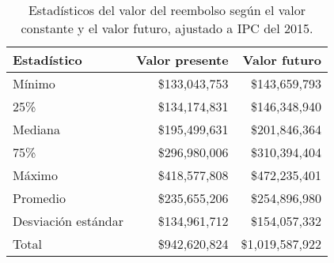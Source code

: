 \begin{table}[!htbp]
\centering
\caption{Estadísticos del valor del reembolso según el valor constante
y el valor futuro, ajustado a IPC del 2015.} 
\label{tab:reembolso}
\begin{tabular}{lrr}
  \hline
Estadístico & Valor presente & Valor futuro \\ 
  \hline
Mínimo & \$133,043,753 & \$143,659,793 \\ 
  25\% & \$134,174,831 & \$146,348,940 \\ 
  Mediana & \$195,499,631 & \$201,846,364 \\ 
  75\% & \$296,980,006 & \$310,394,404 \\ 
  Máximo & \$418,577,808 & \$472,235,401 \\ 
  Promedio & \$235,655,206 & \$254,896,980 \\ 
  Desviación estándar & \$134,961,712 & \$154,057,332 \\ 
  Total & \$942,620,824 & \$1,019,587,922 \\ 
   \hline
\end{tabular}
\end{table}
